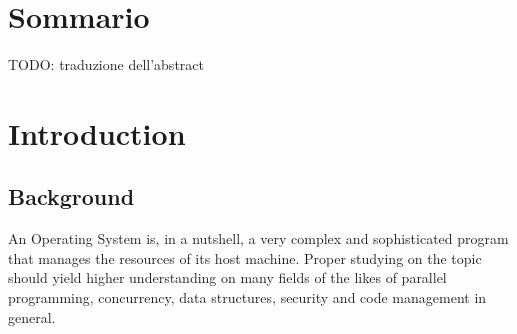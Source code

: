 \documentclass[12pt,a4paper,openright,twoside]{report}
\begin{document}
\clearpage{\pagestyle{empty}\cleardoublepage}%
\chapter*{Sommario}
TODO: traduzione dell'abstract

\renewcommand\labelitemi{\tiny$\bullet$}

\clearpage{\pagestyle{empty}\cleardoublepage}
\tableofcontents                        %
\rhead[\fancyplain{}{\bfseries\leftmark}]{\fancyplain{}{\bfseries\thepage}}
\clearpage{\pagestyle{empty}\cleardoublepage}
\listoffigures                          %
\clearpage{\pagestyle{empty}\cleardoublepage}
\listoftables                           %
\clearpage{\pagestyle{empty}\cleardoublepage}
\chapter{Introduction}                %
\lhead[\fancyplain{}{\bfseries\thepage}]{\fancyplain{}{\bfseries\rightmark}}
\section{Background}
An Operating System is, in a nutshell, a very complex and sophisticated program
that manages the resources of its host machine. Proper studying on the topic 
should yield higher understanding on many fields of the likes of
parallel programming, concurrency, data structures, security and 
code management in general.
\end{document}
